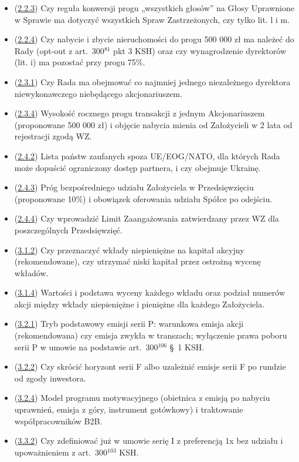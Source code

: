 \documentclass[12pt,a4paper]{report}
\begin{document}
\begin{itemize}
  \item (\hyperref[memo:2.2.3]{2.2.3}) Czy reguła konwersji progu „wszystkich głosów” na Głosy Uprawnione w Sprawie ma dotyczyć wszystkich Spraw Zastrzeżonych, czy tylko lit. l i m.
  \item (\hyperref[memo:2.2.4]{2.2.4}) Czy nabycie i zbycie nieruchomości do progu 500 000 zł ma należeć do Rady (opt-out z art.~300$^{81}$ pkt 3 KSH) oraz czy wynagrodzenie dyrektorów (lit. i) ma pozostać przy progu 75\%.
  \item (\hyperref[memo:2.3.1]{2.3.1}) Czy Rada ma obejmować co najmniej jednego niezależnego dyrektora niewykonawczego niebędącego akcjonariuszem.
  \item (\hyperref[memo:2.3.4]{2.3.4}) Wysokość rocznego progu transakcji z jednym Akcjonariuszem (proponowane 500 000 zł) i objęcie nabycia mienia od Założycieli w 2 lata od rejestracji zgodą WZ.
  \item (\hyperref[memo:2.4.2]{2.4.2}) Lista państw zaufanych spoza UE/EOG/NATO, dla których Rada może dopuścić ograniczony dostęp partnera, i czy obejmuje Ukrainę.
  \item (\hyperref[memo:2.4.3]{2.4.3}) Próg bezpośredniego udziału Założyciela w Przedsięwzięciu (proponowane 10\%) i obowiązek oferowania udziału Spółce po odejściu.
  \item (\hyperref[memo:2.4.4]{2.4.4}) Czy wprowadzić Limit Zaangażowania zatwierdzany przez WZ dla poszczególnych Przedsięwzięć.
  \item (\hyperref[memo:3.1.2]{3.1.2}) Czy przeznaczyć wkłady niepieniężne na kapitał akcyjny (rekomendowane), czy utrzymać niski kapitał przez ostrożną wycenę wkładów.
  \item (\hyperref[memo:3.1.4]{3.1.4}) Wartości i podstawa wyceny każdego wkładu oraz podział numerów akcji między wkłady niepieniężne i pieniężne dla każdego Założyciela.
  \item (\hyperref[memo:3.2.1]{3.2.1}) Tryb podstawowy emisji serii P: warunkowa emisja akcji (rekomendowana) czy emisja zwykła w transzach; wyłączenie prawa poboru serii P w umowie na podstawie art.~300$^{106}$ §~1 KSH.
  \item (\hyperref[memo:3.2.2]{3.2.2}) Czy skrócić horyzont serii F albo uzależnić emisje serii F po rundzie od zgody inwestora.
  \item (\hyperref[memo:3.2.4]{3.2.4}) Model programu motywacyjnego (obietnica z emisją po nabyciu uprawnień, emisja z góry, instrument gotówkowy) i traktowanie współpracowników B2B.
  \item (\hyperref[memo:3.3.2]{3.3.2}) Czy zdefiniować już w umowie serię I z preferencją 1x bez udziału i upoważnieniem z art.~300$^{103}$ KSH.

\end{itemize}
\end{document}
